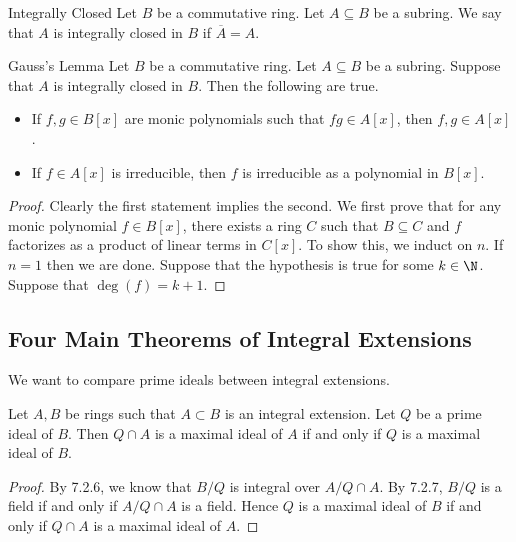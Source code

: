 \documentclass[a4paper]{article}
\begin{document}
\begin{defn}{Integrally Closed}{} Let $B$ be a commutative ring. Let $A\subseteq B$ be a subring. We say that $A$ is integrally closed in $B$ if $\overline{A}=A$. 
\end{defn}

\begin{thm}{Gauss's Lemma}{} Let $B$ be a commutative ring. Let $A\subseteq B$ be a subring. Suppose that $A$ is integrally closed in $B$. Then the following are true. 
\begin{itemize}
\item If $f,g\in B[x]$ are monic polynomials such that $fg\in A[x]$, then $f,g\in A[x]$. 
\item If $f\in A[x]$ is irreducible, then $f$ is irreducible as a polynomial in $B[x]$. 
\end{itemize} 
\begin{proof}
Clearly the first statement implies the second. We first prove that for any monic polynomial $f\in B[x]$, there exists a ring $C$ such that $B\subseteq C$ and $f$ factorizes as a product of linear terms in $C[x]$. To show this, we induct on $n$. If $n=1$ then we are done. Suppose that the hypothesis is true for some $k\in\N$. Suppose that $\deg(f)=k+1$. 
\end{proof}
\end{thm}

\subsection{Four Main Theorems of Integral Extensions}
We want to compare prime ideals between integral extensions. 

\begin{lmm}{}{} Let $A,B$ be rings such that $A\subset B$ is an integral extension. Let $Q$ be a prime ideal of $B$. Then $Q\cap A$ is a maximal ideal of $A$ if and only if $Q$ is a maximal ideal of $B$. 
\begin{proof}
By 7.2.6, we know that $B/Q$ is integral over $A/Q\cap A$. By 7.2.7, $B/Q$ is a field if and only if $A/Q\cap A$ is a field. Hence $Q$ is a maximal ideal of $B$ if and only if $Q\cap A$ is a maximal ideal of $A$. 
\end{proof}
\end{lmm}
\end{document}

